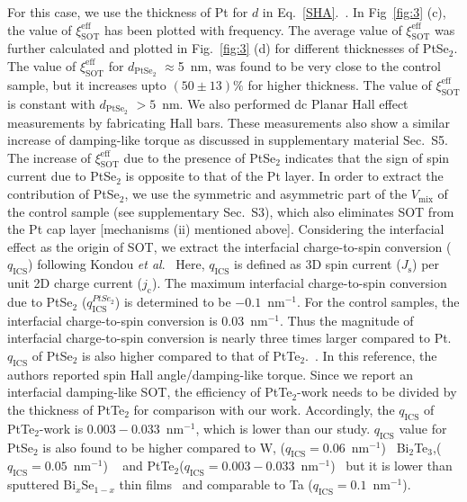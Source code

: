 \documentclass[journal=jacsat,manuscript=article]{achemso}
\begin{document}
For this case, we use  the thickness of Pt for $d$ in Eq.~\ref{SHA}.~\cite{liu2019strain}. In Fig~\ref{fig:3} (c), the value of $\xi_\mathrm{SOT}^\mathrm{eff}$ has been plotted with frequency. The average value of $\xi_\mathrm{SOT}^\mathrm{eff}$ was further calculated and plotted in Fig.~\ref{fig:3} (d) for different thicknesses of PtSe$_2$. The value of $\xi_\mathrm{SOT}^\mathrm{eff}$ for $d_\mathrm{PtSe_2}$ $\approx$5~nm, was found to be 
 very close to the control sample, but it increases upto $(50\pm 13)\%$ for higher thickness. The value of $\xi_\mathrm{SOT}^\mathrm{eff}$ is constant with $d_\mathrm{PtSe_2}$ $>5$~nm. We also performed dc Planar Hall effect measurements by fabricating Hall bars. These measurements also show a similar increase of damping-like torque as discussed in supplementary material Sec.~S5. The increase of $\xi_\mathrm{SOT}^\mathrm{eff}$ due to the presence of PtSe$_2$ indicates that the sign of spin current due to PtSe$_2$ is opposite to that of the Pt layer. In order to extract the contribution of PtSe$_2$, we use the symmetric and asymmetric part of the $V_\mathrm{mix}$ of the control sample (see supplementary Sec.~S3), which also eliminates SOT from the Pt cap layer [mechanisms (ii) mentioned above]. Considering the interfacial effect as the origin of SOT, we extract the interfacial charge-to-spin conversion ($q_\mathrm{ICS}$) following Kondou \textit{et al}.~\cite{kondou2016fermi} Here, $q_\mathrm{ICS}$ is defined as 3D spin current ($J_\mathrm{s}$) per unit 2D charge current ($j_\mathrm{c}$). The maximum interfacial charge-to-spin conversion due to PtSe$_2$ ($q_\mathrm{ICS}^{PtSe_2}$) is determined to be $-0.1$~nm$^{-1}$. For the control samples, the interfacial charge-to-spin conversion is $0.03$~nm$^{-1}$. Thus the magnitude of interfacial charge-to-spin conversion is nearly three times larger compared to Pt. $q_\mathrm{ICS}$ of PtSe$_2$ is also higher compared to
 that of PtTe$_2$.~\cite{xu2020high}. In this reference, the authors reported spin Hall angle/damping-like torque. Since we report an interfacial damping-like SOT, the efficiency of   PtTe$_2$-work needs to be divided by the thickness of PtTe$_2$ for comparison with our work. Accordingly, the $q_\mathrm{ICS}$ of PtTe$_2$-work is $0.003-0.033$~nm$^{-1}$, which is lower than our study. $q_\mathrm{ICS}$ value for PtSe$_2$ is also found to be higher compared to W, ($q_\mathrm{ICS}=0.06$~nm$^{-1}$)~\cite{wu2019room} Bi$_2$Te$_3$,($q_\mathrm{ICS}=0.05$~nm$^{-1}$) ~\cite{wu2019room} and PtTe$_2$($q_\mathrm{ICS}=0.003-0.033$~nm$^{-1}$)~\cite{xu2020high} but it is lower than  sputtered Bi$_x$Se$_{1-x}$ thin films~\cite{dc2018room} and comparable to Ta ($q_\mathrm{ICS}=0.1$~nm$^{-1}$).~\cite{wu2019room}
 
\end{document}
